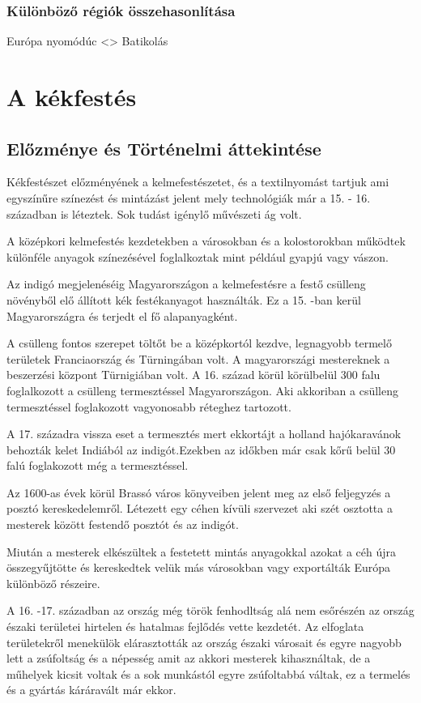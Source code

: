 \documentclass[fontsize=12pt, appendixprefix=true]{scrreprt}
\begin{document}
\subsection{Különböző régiók összehasonlítása}
   Európa nyomódúc <> Batikolás

\chapter{A kékfestés}
\section{Előzménye és Történelmi áttekintése}
Kékfestészet előzményének a kelmefestészetet, és a textilnyomást tartjuk ami egyszínűre színezést és mintázást jelent mely technológiák már a 15. - 16. században is léteztek. Sok tudást igénylő művészeti ág volt.

A középkori kelmefestés kezdetekben a városokban és a kolostorokban működtek különféle anyagok színezésével foglalkoztak mint például gyapjú vagy vászon. 

Az indigó megjelenéséig Magyarországon a kelmefestésre a festő csülleng növényből elő állított kék festékanyagot használták. Ez a 15. -ban kerül Magyarországra és terjedt el fő alapanyagként.

A csülleng fontos szerepet töltőt be a középkortól kezdve, legnagyobb termelő területek Franciaország és Türningában volt. A magyarországi mestereknek a beszerzési központ Türnigiában volt.
A 16. század körül körülbelül 300 falu foglalkozott a csülleng termesztéssel Magyarországon. Aki akkoriban a csülleng termesztéssel foglakozott vagyonosabb réteghez tartozott. 

A 17. századra vissza eset a termesztés mert ekkortájt a holland hajókaravánok behozták kelet Indiából az indigót.Ezekben az időkben már csak kőrű belül 30 falú foglakozott még a termesztéssel.

Az 1600-as évek körül Brassó város könyveiben jelent meg az első feljegyzés a posztó kereskedelemről.
Létezett egy céhen kívüli szervezet aki szét osztotta a mesterek között festendő posztót és az indigót. 

Miután a mesterek elkészültek a festetett mintás anyagokkal azokat a céh újra összegyűjtötte és kereskedtek  velük más városokban vagy exportálták Európa különböző részeire.

A 16. -17. században az ország még török fenhodltság alá nem esőrészén az ország északi területei hirtelen és hatalmas fejlődés vette kezdetét.
Az elfoglata területekről menekülök elárasztották az ország északi városait és egyre nagyobb lett a zsúfoltság és a népesség amit az akkori mesterek kihasználtak, de a műhelyek kicsit voltak és a sok munkástól egyre zsúfoltabbá váltak, ez a termelés és a gyártás káráravált már ekkor.
\end{document}
